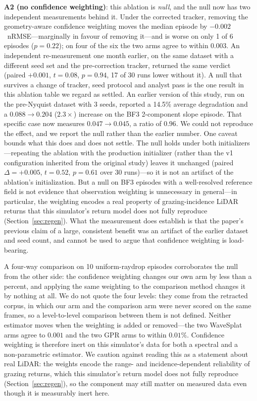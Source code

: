 \textbf{A2 (no confidence weighting)}: this ablation is \emph{null}, and
the null now has two independent measurements behind it.  Under the
corrected tracker, removing the geometry-aware confidence weighting moves
the median episode by $-0.002$~nRMSE---marginally in favour of removing
it---and is worse on only 1 of 6 episodes ($p=0.22$); on four of the six
the two arms agree to within $0.003$.  An independent re-measurement one
month earlier, on the same dataset with a different seed set and the
pre-correction tracker, returned the same verdict (paired $+0.001$,
$t=0.08$, $p=0.94$, 17 of 30 runs lower without it).  A null that
survives a change of tracker, seed protocol and analyst pass is the one
result in this ablation table we regard as settled.
An earlier version of this study, run on the pre-Nyquist dataset with
3 seeds, reported a 14.5\% average degradation and a
$0.088 \to 0.204$ ($2.3\times$) increase on the BF3 2-component
slope episode.  That specific case now measures
$0.047 \to 0.045$, a ratio of $0.96$.  We could not reproduce the
effect, and we report the null rather than the earlier number.
One caveat bounds what this does and does not settle.  The null holds
under both initializers---repeating the ablation with the production
initializer (rather than the v1 configuration inherited from the
original study) leaves it unchanged (paired $\Delta=+0.005$, $t=0.52$,
$p=0.61$ over 30 runs)---so it is not an artifact of the ablation's
initialization.  But a null on BF3 episodes with a well-resolved
reference field is not evidence that observation weighting is
unnecessary in general---in particular, the weighting encodes a real
property of grazing-incidence LiDAR returns that this simulator's
return model does not fully reproduce (Section~\ref{sec:regen}).  What the measurement does establish is that
the paper's previous claim of a large, consistent benefit was an
artifact of the earlier dataset and seed count, and cannot be used to
argue that confidence weighting is load-bearing.

A four-way comparison on 10 uniform-raydrop episodes corroborates the
null from the other side: the confidence weighting changes our own arm by less
than a percent, and applying the same weighting to the comparison method changes
it by nothing at all. We do not quote the four levels: they come from the
retracted corpus, in which our arm and the comparison arm were never scored on
the same frames, so a level-to-level comparison between them is not defined.
Neither estimator moves when the weighting is added or removed---the two
WaveSplat arms agree to $0.001$ and the two GPR arms to within $0.01\%$.
Confidence weighting is therefore inert on this simulator's data for
both a spectral and a non-parametric estimator.  We caution against
reading this as a statement about real LiDAR: the weights encode the
range- and incidence-dependent reliability of grazing returns, which
this simulator's return model does not fully reproduce
(Section~\ref{sec:regen}), so the component may still matter on
measured data even though it is measurably inert here.

